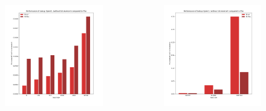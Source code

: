 \documentclass[aspectratio=169]{beamer}
\begin{document}
\begin{frame}{}
	\begingroup
	\small
	\begin{columns}
		\begin{column}{0.50\textwidth}
			\begin{figure}
				\includegraphics[width=1\textwidth]{resources/images/lookup-fft-low.png}
			\end{figure}
		\end{column}
		\begin{column}{0.50\textwidth}
			\begin{figure}
				\includegraphics[width=1\textwidth]{resources/images/lookup-fft-high.png}

\end{figure}
\end{column}
\end{columns}
\end{frame}
\end{document}
